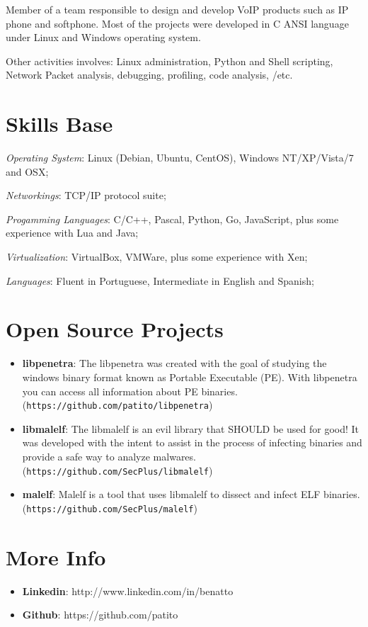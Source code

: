 \documentclass[margin]{res}
\begin{document}
\begin{resume}
    Member of a team responsible to design and develop VoIP products such as IP phone and 
    softphone. Most of the projects were developed in C ANSI language under Linux and Windows
    operating system.

    Other activities involves: Linux administration, Python and Shell scripting, Network Packet analysis, debugging, profiling, code analysis, /etc.
    

\section{Skills Base}

      \textit{Operating System}:  Linux (Debian, Ubuntu, CentOS), Windows NT/XP/Vista/7 and OSX;

			\textit{Networkings}: TCP/IP protocol suite;
  
			\textit{Progamming Languages}: C/C++, Pascal, Python, Go, JavaScript, plus some experience with Lua and Java;
  
			\textit{Virtualization}: VirtualBox, VMWare, plus some experience with Xen;

			\textit{Languages}: Fluent in Portuguese, Intermediate in English and Spanish;
 
\section{Open Source Projects}
		\begin{itemize}
		    \vspace{2mm}
		    \item \textbf{libpenetra}: The libpenetra was created with the goal of studying the windows binary format known as Portable Executable (PE). With libpenetra you can access all information about PE binaries. (\texttt{https://github.com/patito/libpenetra}) \vspace{1mm}
		                               
		    \item \textbf{libmalelf}: The libmalelf is an evil library that SHOULD be used for good! It was developed with the intent to assist in the process of infecting binaries and provide a safe way to analyze malwares. (\texttt{https://github.com/SecPlus/libmalelf})\vspace{1mm}
		                              
		    \item \textbf{malelf}: Malelf is a tool that uses libmalelf to dissect and infect ELF binaries. (\texttt{https://github.com/SecPlus/malelf})
		\end{itemize}
 
\section{More Info}
    \begin{itemize}
        \item \textbf{Linkedin}: http://www.linkedin.com/in/benatto
         \item \textbf{Github}: https://github.com/patito
    \end{itemize}


\end{resume} 
\end{document}
